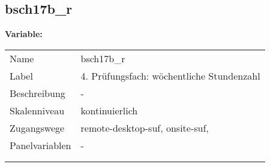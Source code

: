 	
	
	\subsection{bsch17b\_r}
	\label{subSection:bsch17b_r}

	\noindent\textbf{Variable:}\\
		\begin{tabular}{lL{11.3cm}}
			\label{tableVariable:bsch17b_r}
			Name & bsch17b\_r \\
			Label & 4. Prüfungsfach: wöchentliche Stundenzahl \\
			Beschreibung & - \\
			Skalenniveau & kontinuierlich \\
			Zugangswege &
				remote-desktop-suf,
				onsite-suf,
 \\
			Panelvariablen & -
			 \\
			 \\
 \\
		\end{tabular}






